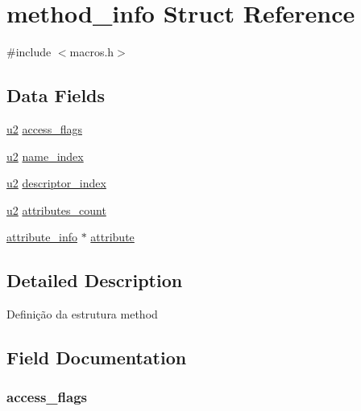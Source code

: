 \hypertarget{structmethod__info}{}\section{method\+\_\+info Struct Reference}
\label{structmethod__info}


{\ttfamily \#include $<$macros.\+h$>$}

\subsection*{Data Fields}
\begin{DoxyCompactItemize}
\item 
\hyperlink{macros_8h_a732cde1300aafb73b0ea6c2558a7a54f}{u2} \hyperlink{structmethod__info_a4cc32d48303aeaaaaea05bf77abdec59}{access\+\_\+flags}
\item 
\hyperlink{macros_8h_a732cde1300aafb73b0ea6c2558a7a54f}{u2} \hyperlink{structmethod__info_ae939ac3ca00f5727beaa02d0e339183d}{name\+\_\+index}
\item 
\hyperlink{macros_8h_a732cde1300aafb73b0ea6c2558a7a54f}{u2} \hyperlink{structmethod__info_a3f13794b6c8b4ffc87b87a7c01a69060}{descriptor\+\_\+index}
\item 
\hyperlink{macros_8h_a732cde1300aafb73b0ea6c2558a7a54f}{u2} \hyperlink{structmethod__info_aa53122439ee827a418258d52c51368c6}{attributes\+\_\+count}
\item 
\hyperlink{macros_8h_a6e3cdeb6f8c542bea1decdee365bffbb}{attribute\+\_\+info} $\ast$ \hyperlink{structmethod__info_a6f532dd7d830de037d40199f21a548b7}{attribute}
\end{DoxyCompactItemize}


\subsection{Detailed Description}
Definição da estrutura method 

\subsection{Field Documentation}
\hypertarget{structmethod__info_a4cc32d48303aeaaaaea05bf77abdec59}{}
\subsubsection[{access\+\_\+flags}]{ access\+\_\+flags}\label{structmethod__info_a4cc32d48303aeaaaaea05bf77abdec59}
\hypertarget{structmethod__info_a6f532dd7d830de037d40199f21a548b7}{}
